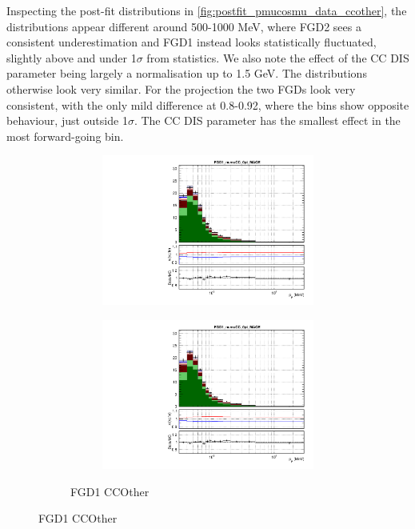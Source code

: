 Inspecting the \pmu \cosmu post-fit distributions in \autoref{fig:postfit_pmucosmu_data_ccother}, the \pmu distributions appear different around 500-1000 MeV, where FGD2 sees a consistent underestimation and FGD1 instead looks statistically fluctuated, slightly above and under 1$\sigma$ from statistics. We also note the effect of the CC DIS parameter being largely a normalisation up to 1.5 GeV. The distributions otherwise look very similar. For the \cosmu projection the two FGDs look very consistent, with the only mild difference at 0.8-0.92, where the bins show opposite behaviour, just outside 1$\sigma$. The CC DIS parameter has the smallest effect in the most forward-going bin.
\begin{figure}[h]
	\begin{subfigure}[t]{\textwidth}
	\begin{subfigure}[t]{0.49\textwidth}
		\includegraphics[width=\textwidth, trim={0mm 0mm 0mm 6mm}, clip,page=101]{figures/mach3/data/postfit/2017b_NewDet_3Xsec_4Det_5Flux_NewXSecTune_Data_merge_PostFit_0_1_rootstack}
	\end{subfigure}
	\begin{subfigure}[t]{0.49\textwidth}
		\includegraphics[width=\textwidth, trim={0mm 0mm 0mm 6mm}, clip,page=102]{figures/mach3/data/postfit/2017b_NewDet_3Xsec_4Det_5Flux_NewXSecTune_Data_merge_PostFit_0_1_rootstack}
	\end{subfigure}
\caption{FGD1 CCOther}
\end{subfigure}
	

\end{figure}
